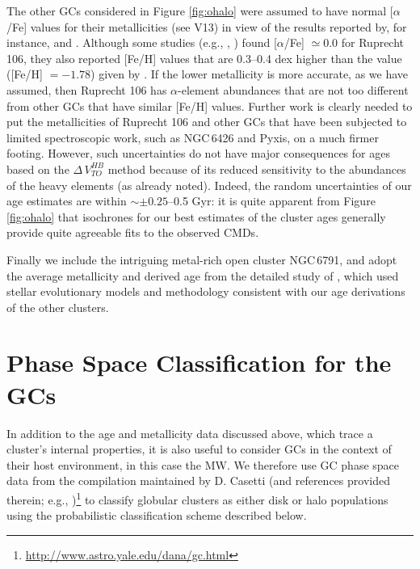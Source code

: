 \documentclass[useAMS,usenatbib]{mn2e}
\begin{document}
The other GCs considered in Figure \ref{fig:ohalo} were assumed to have normal
[$\alpha$/Fe] values for their metallicities (see V13) in view of the results
reported by, for instance, \citet{Smeckerhane02} and \citet{Mottini08}.  Although some
studies (e.g., \citealt{Brown97}, \citealt{Pritzl05}) found [$\alpha$/Fe] $\simeq
0.0$ for Ruprecht 106, they also reported [Fe/H] values that are 0.3--0.4 dex
higher than the value ([Fe/H] $= -1.78$) given by \citet{CG09}.  If the lower
metallicity is more accurate, as we have assumed, then Ruprecht 106 has
$\alpha$-element abundances that are not too different from other GCs that have
similar [Fe/H] values.  Further work is clearly needed to put the metallicities
of Ruprecht 106 and other GCs that have been subjected to limited spectroscopic
work, such as NGC$\,$6426 and Pyxis, on a much firmer footing.  However, such
uncertainties do not have major consequences for ages based on the
$\Delta\,V_{TO}^{HB}$ method because of its reduced sensitivity to the
abundances of the heavy elements (as already noted).  Indeed, the random
uncertainties of our age estimates are within $\sim \pm 0.25$--0.5 Gyr: it
is quite apparent from Figure \ref{fig:ohalo} that isochrones for our best
estimates of the cluster ages generally provide quite agreeable fits to the
observed CMDs.

Finally we include the intriguing metal-rich open cluster NGC$\,$6791, and adopt the
average metallicity and derived age from the detailed study of \citep{Brogaard12},
which used stellar evolutionary models and methodology consistent with our
age derivations of the other clusters.

\section{Phase Space Classification for the GCs}
In addition to the age and metallicity data discussed above, 
which trace a cluster's internal properties, it is also useful to 
consider GCs in the context of their host environment, in this case the MW.  
We therefore use GC phase space data from the compilation maintained by 
D. Casetti (and references provided therein; e.g., \citealt{Casetti07})\footnote{\url{http://www.astro.yale.edu/dana/gc.html}} to classify globular clusters
as either disk or halo populations using the probabilistic 
classification scheme described below. 
\end{document}
